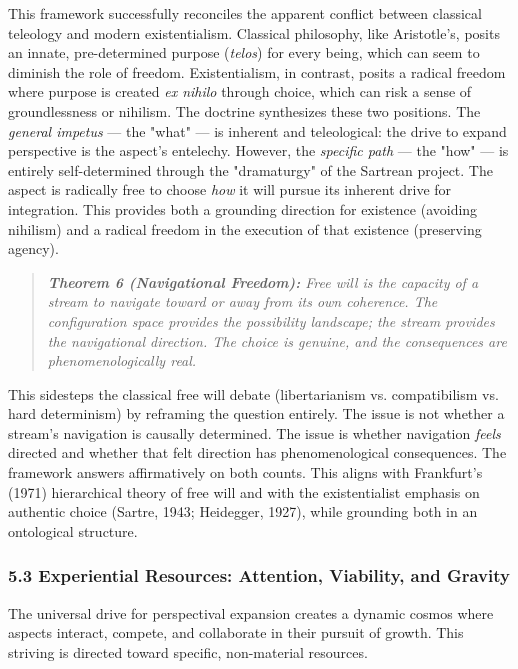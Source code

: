 This framework successfully reconciles the apparent conflict between classical teleology and modern existentialism. Classical philosophy, like Aristotle's, posits an innate, pre-determined purpose (\textit{telos}) for every being, which can seem to diminish the role of freedom. Existentialism, in contrast, posits a radical freedom where purpose is created \textit{ex nihilo} through choice, which can risk a sense of groundlessness or nihilism. The doctrine synthesizes these two positions. The \textit{general impetus} — the "what" — is inherent and teleological: the drive to expand perspective is the aspect's entelechy. However, the \textit{specific path} — the "how" — is entirely self-determined through the "dramaturgy" of the Sartrean project. The aspect is radically free to choose \textit{how} it will pursue its inherent drive for integration. This provides both a grounding direction for existence (avoiding nihilism) and a radical freedom in the execution of that existence (preserving agency).


\begin{quote}
\itshape
\textbf{Theorem 6 (Navigational Freedom):} \textit{Free will is the capacity of a stream to navigate toward or away from its own coherence. The configuration space provides the possibility landscape; the stream provides the navigational direction. The choice is genuine, and the consequences are phenomenologically real.}
\end{quote}


This sidesteps the classical free will debate (libertarianism vs. compatibilism vs. hard determinism) by reframing the question entirely. The issue is not whether a stream's navigation is causally determined. The issue is whether navigation \textit{feels} directed and whether that felt direction has phenomenological consequences. The framework answers affirmatively on both counts. This aligns with Frankfurt's (1971) hierarchical theory of free will and with the existentialist emphasis on authentic choice (Sartre, 1943; Heidegger, 1927), while grounding both in an ontological structure.


\subsubsection*{5.3 Experiential Resources: Attention, Viability, and Gravity}


The universal drive for perspectival expansion creates a dynamic cosmos where aspects interact, compete, and collaborate in their pursuit of growth. This striving is directed toward specific, non-material resources.


